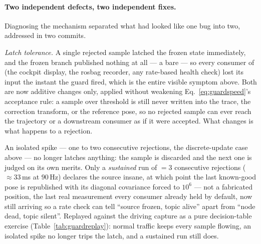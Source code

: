 \paragraph{Two independent defects, two independent fixes.} Diagnosing the
mechanism separated what had looked like one bug into two, addressed in two
commits.

\emph{Latch tolerance.} A single rejected sample latched the frozen state
immediately, and the frozen branch published nothing at all --- a bare
 --- so every consumer of  (the
cockpit display, the rosbag recorder, any rate-based health check) lost its
input the instant the guard fired, which is the entire visible symptom above.
Both are now additive changes only, applied without weakening
Eq.~\ref{eq:guardspeed}'s acceptance rule: a sample over threshold is still
never written into the trace, the correction transform, or the reference
pose, so no rejected sample can ever reach the trajectory or a downstream
consumer as if it were accepted. What changes is what happens to a rejection.
\begin{center}
\end{center}
An isolated spike --- one to two consecutive rejections, the discrete-update
case above --- no longer latches anything: the sample is discarded and the
next one is judged on its own merits. Only a \emph{sustained} run of
$=3$ consecutive rejections ($\approx 33$\,ms at
$90$\,Hz) declares the source insane, at which point the last known-good pose
is republished with its diagonal covariance forced to $10^6$ --- not a
fabricated position, the last real measurement every consumer already held by
default, now still arriving so a rate check can tell ``source frozen, topic
alive'' apart from ``node dead, topic silent''. Replayed against the driving
capture as a pure decision-table exercise (Table~\ref{tab:guardreplay}):
normal traffic keeps every sample flowing, an isolated spike no longer trips
the latch, and a sustained run still does.

